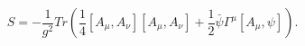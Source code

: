 \begin{equation}
S=-\frac{1}{g^{2}}Tr
\left(\frac{1}{4}
[A_{\mu},A_{\nu}][A_{\mu},A_{\nu}]
+\frac{1}{2}\bar{\psi}\Gamma^{\mu}
[A_{\mu},\psi]
\right).
\label{IIBaction}
\end{equation}

